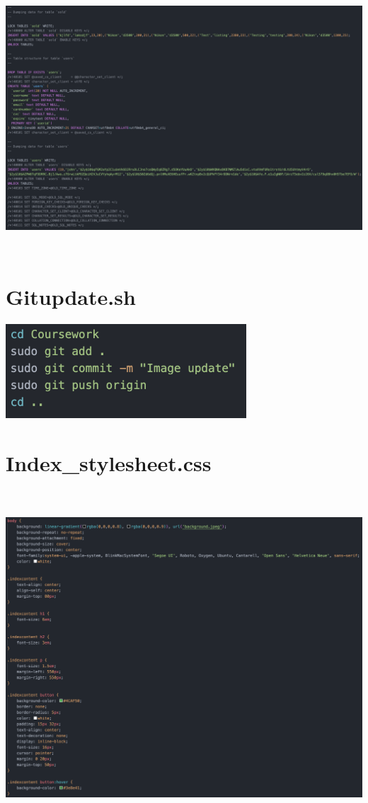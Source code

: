 \includegraphics[width=6.26806in,height=3.94653in]{ch6_appendix/media/image24.png}

\section*{Gitupdate.sh}

\includegraphics[width=3.54167in,height=1.38889in]{ch6_appendix/media/image25.png}

\section*{Index\_stylesheet.css}\includegraphics[width=6.26806in,height=4.92847in]{ch6_appendix/media/image26.png}

